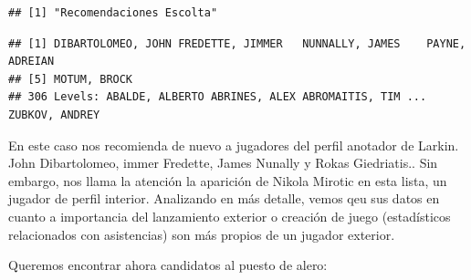 \documentclass[
]{article}
\newenvironment{Shaded}{\begin{snugshade}}{\end{snugshade}}
\newcommand{\DataTypeTok}[1]{\textcolor[rgb]{0.13,0.29,0.53}{#1}}
\newcommand{\DecValTok}[1]{\textcolor[rgb]{0.00,0.00,0.81}{#1}}
\newcommand{\KeywordTok}[1]{\textcolor[rgb]{0.13,0.29,0.53}{\textbf{#1}}}
\newcommand{\NormalTok}[1]{#1}
\newcommand{\OperatorTok}[1]{\textcolor[rgb]{0.81,0.36,0.00}{\textbf{#1}}}
\newcommand{\OtherTok}[1]{\textcolor[rgb]{0.56,0.35,0.01}{#1}}
\newcommand{\StringTok}[1]{\textcolor[rgb]{0.31,0.60,0.02}{#1}}
\begin{document}
\begin{verbatim}
## [1] "Recomendaciones Escolta"
\end{verbatim}

\begin{Shaded}
\end{Shaded}

\begin{verbatim}
## [1] DIBARTOLOMEO, JOHN FREDETTE, JIMMER   NUNNALLY, JAMES    PAYNE, ADREIAN    
## [5] MOTUM, BROCK      
## 306 Levels: ABALDE, ALBERTO ABRINES, ALEX ABROMAITIS, TIM ... ZUBKOV, ANDREY
\end{verbatim}

En este caso nos recomienda de nuevo a jugadores del perfil anotador de
Larkin. John Dibartolomeo, immer Fredette, James Nunally y Rokas
Giedriatis.. Sin embargo, nos llama la atención la aparición de Nikola
Mirotic en esta lista, un jugador de perfil interior. Analizando en más
detalle, vemos qeu sus datos en cuanto a importancia del lanzamiento
exterior o creación de juego (estadísticos relacionados con asistencias)
son más propios de un jugador exterior.

Queremos encontrar ahora candidatos al puesto de alero:

\begin{Shaded}
\end{Shaded}
\end{document}
